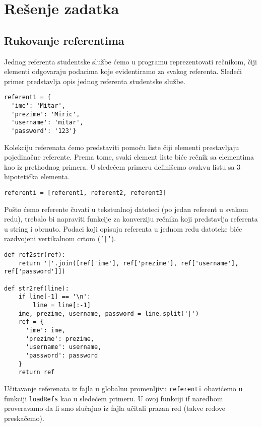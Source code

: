 \documentclass[a4paper]{article}
\begin{document}
\section{Rešenje zadatka}

\subsection{Rukovanje referentima}

Jednog referenta studentske službe ćemo u programu reprezentovati rečnikom, čiji
elementi odgovaraju podacima koje evidentiramo za svakog referenta. Sledeći
primer predstavlja opis jednog referenta studentske službe.

\begin{verbatim}
referent1 = {
  'ime': 'Mitar',
  'prezime': 'Miric',
  'username': 'mitar',
  'password': '123'}
\end{verbatim}

Kolekciju referenata ćemo predstaviti pomoću liste čiji elementi prestavljaju
pojedinačne referente. Prema tome, svaki element liste biće rečnik sa
elementima kao iz prethodnog primera. U sledećem primeru definišemo ovakvu listu
sa 3 hipotetička elementa.

\begin{verbatim}
referenti = [referent1, referent2, referent3]
\end{verbatim}

Pošto ćemo referente čuvati u tekstualnoj datoteci (po jedan referent u svakom
redu), trebalo bi napraviti funkcije za konverziju rečnika koji predstavlja
referenta u string i obrnuto. Podaci koji opisuju referenta u jednom redu
datoteke biće razdvojeni vertikalnom crtom (\texttt{'|'}).

\begin{verbatim}
def ref2str(ref):
    return '|'.join([ref['ime'], ref['prezime'], ref['username'],
ref['password']])

def str2ref(line):
    if line[-1] == '\n':
        line = line[:-1]
    ime, prezime, username, password = line.split('|')
    ref = {
      'ime': ime,
      'prezime': prezime,
      'username': username,
      'password': password
    }
    return ref
\end{verbatim}

Učitavanje referenata iz fajla u globalnu promenljivu \texttt{referenti}
obavićemo u funkciji \texttt{loadRefs} kao u sledećem primeru. U ovoj funkciji
if naredbom proveravamo da li smo slučajno iz fajla učitali prazan red (takve
redove preskačemo).
\end{document}
